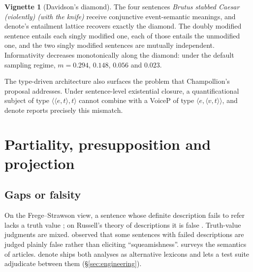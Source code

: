 \documentclass[11pt,a4paper]{article}
\newcommand{\dn}{\textsf{denote}}
\newcommand{\ty}[1]{\langle #1\rangle}
\theoremstyle{definition}
\newtheorem{vignette}{Vignette}
\begin{document}
\begin{vignette}[Davidson's diamond]\label{v:diamond}
The four sentences \textit{Brutus stabbed Caesar (violently) (with the knife)} receive conjunctive event-semantic meanings, and \dn{}'s entailment lattice recovers exactly the diamond. The doubly modified sentence entails each singly modified one, each of those entails the unmodified one, and the two singly modified sentences are mutually independent. Informativity decreases monotonically along the diamond: under the default sampling regime, $m=0.294$, $0.148$, $0.056$ and $0.023$.
\end{vignette}

The type-driven architecture also surfaces the problem that Champollion's proposal addresses. Under sentence-level existential closure, a quantificational subject of type $\ty{\ty{e,t},t}$ cannot combine with a VoiceP of type $\ty{e,\ty{v,t}}$, and \dn{} reports precisely this mismatch.

\section{Partiality, presupposition and projection}\label{sec:presup}

\subsection{Gaps or falsity}
On the Frege--Strawson view, a sentence whose definite description fails to refer lacks a truth value \citep{frege1892,strawson1950}; on Russell's theory of descriptions it is false \citep{russell1905}. Truth-value judgments are mixed. \citet{vonfintel2004} observed that some sentences with failed descriptions are judged plainly false rather than eliciting ``squeamishness''. \citet{heim1991} surveys the semantics of articles. \dn{} ships both analyses as alternative lexicons and lets a test suite adjudicate between them (\S\ref{sec:engineering}).
\end{document}
